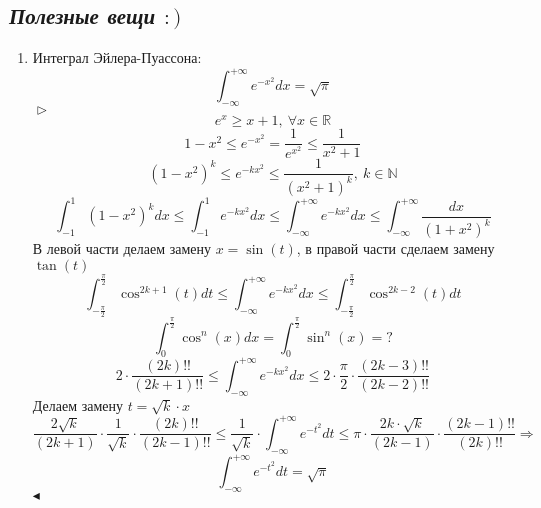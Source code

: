 \documentclass{article}
\newcommand*{\prooff}[1]{$\vartriangleright$ #1 $\blacktriangleleft$}
\newcommand*{\R}{\mathbb{R}}
\begin{document}
\subsection{\textit{Полезные вещи $:\bigl)$}} 
\begin{enumerate}
    \item Интеграл Эйлера-Пуассона:\\ {
        $$
            \int_{-\infty}^{+\infty} e^{-x^2}dx = \sqrt{\pi}
        $$
        \prooff{
            $$
            e^x \geq x + 1,\ \forall x \in \R
            $$
            $$
                1 - x^2 \leq e^{-x^2} = \frac{1}{e^{x^2}} \leq \frac{1}{x^2 + 1}
            $$
            $$
                (1 - x^2)^k \leq e^{-kx^2} \leq \frac{1}{(x^2 + 1)^k},\ k \in \mathbb{N}
            $$
            $$
                \int_{-1}^{1}(1 - x^2)^k dx \leq \int_{-1}^{1}e^{-kx^2}dx \leq \int_{-\infty}^{+\infty}e^{-kx^2}dx \leq \int_{-\infty}^{+\infty} \frac{dx}{(1 + x^2)^k}
            $$
            В левой части делаем замену $x = \sin(t)$, в правой части сделаем замену $\tan(t)$
            $$
                \int_{-\frac{\pi}{2}}^{\frac{\pi}{2}}\cos^{2k+1}(t)dt \leq \int_{-\infty}^{+\infty}e^{-kx^2}dx \leq \int_{-\frac{\pi}{2}}^{\frac{\pi}{2}}\cos^{2k-2}(t)dt
            $$
            $$
                \int_{0}^{\frac{\pi}{2}} \cos^n(x)dx = \int_{0}^{\frac{\pi}{2}} \sin^n(x) = ?
            $$
            $$
                2 \cdot \frac{(2k)!!}{(2k+1)!!} \leq \int_{-\infty}^{+\infty}e^{-kx^2} dx \leq 2 \cdot \frac{\pi}{2} \cdot \frac{(2k - 3)!!}{(2k - 2)!!}
            $$
            Делаем замену $t = \sqrt{k} \cdot x$
            $$
                \frac{2\sqrt{k}}{(2k + 1)} \cdot \frac{1}{\sqrt{k}}\cdot \frac{(2k)!!}{(2k - 1)!!} \leq \frac{1}{\sqrt{k}} \cdot \int_{-\infty}^{+\infty}e^{-t^2}dt \leq \pi \cdot \frac{2k \cdot \sqrt{k}}{(2k - 1)} \cdot \frac{(2k - 1)!!}{(2k)!!} \Rightarrow
            $$
            $$
                \int_{-\infty}^{+\infty}e^{-t^2}dt = \sqrt{\pi}
            $$
        }
    } 
\end{enumerate}
\end{document}
